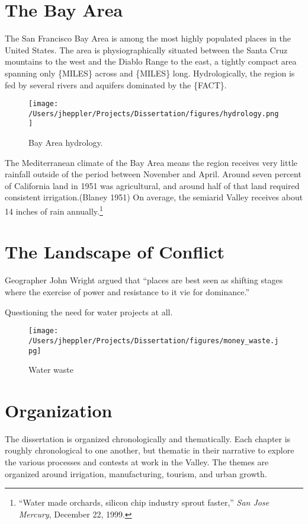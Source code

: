 \documentclass[11pt,article,oneside]{memoir}
\makeatletter
\def\maxwidth{\ifdim\Gin@nat@width>\linewidth\linewidth
\else\Gin@nat@width\fi}
\let\Oldincludegraphics\includegraphics
\renewcommand{\includegraphics}[1]{\Oldincludegraphics[width=\maxwidth]{#1}}
\makeatother
\begin{document}
\section{The Bay Area}

The San Francisco Bay Area is among the most highly populated places in
the United States. The area is physiographically situated between the
Santa Cruz mountains to the west and the Diablo Range to the east, a
tightly compact area spanning only \{MILES\} across and \{MILES\} long.
Hydrologically, the region is fed by several rivers and aquifers
dominated by the \{FACT\}.

\begin{figure}[htbp]
\centering
\texttt{[image: /Users/jheppler/Projects/Dissertation/figures/hydrology.png]}
\caption{Bay Area hydrology.}
\end{figure}

The Mediterranean climate of the Bay Area means the region receives very
little rainfall outside of the period between November and April. Around
seven percent of California land in 1951 was agricultural, and around
half of that land required consistent irrigation.(Blaney 1951) On
average, the semiarid Valley receives about 14 inches of rain
annually.\footnote{``Water made orchards, silicon chip industry sprout
  faster,'' \emph{San Jose Mercury}, December 22, 1999.}

\section{The Landscape of Conflict}

Geographer John Wright argued that ``places are best seen as shifting
stages where the exercise of power and resistance to it vie for
dominance.''

Questioning the need for water projects at all.

\begin{figure}[htbp]
\centering
\texttt{[image: /Users/jheppler/Projects/Dissertation/figures/money\_waste.jpg]}
\caption{Water waste}
\end{figure}

\section{Organization}

The dissertation is organized chronologically and thematically. Each
chapter is roughly chronological to one another, but thematic in their
narrative to explore the various processes and contests at work in the
Valley. The themes are organized around irrigation, manufacturing,
tourism, and urban growth.
\end{document}
